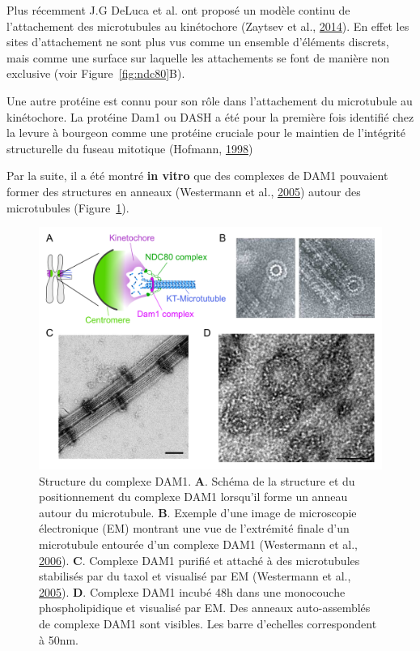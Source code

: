 \documentclass[12pt,a4paper,twoside,openright]{book}
\begin{document}
Plus récemment J.G DeLuca et al. ont proposé un modèle continu de
l'attachement des microtubules au kinétochore (Zaytsev et al.,
\protect\hyperlink{ref-Zaytsev2014}{2014}). En effet les sites
d'attachement ne sont plus vus comme un ensemble d'éléments discrets,
mais comme une surface sur laquelle les attachements se font de manière
non exclusive (voir Figure~\ref{fig:ndc80}B).

Une autre protéine est connu pour son rôle dans l'attachement du
microtubule au kinétochore. La protéine Dam1 ou DASH a été pour la
première fois identifié chez la levure à bourgeon comme une protéine
cruciale pour le maintien de l'intégrité structurelle du fuseau
mitotique (Hofmann, \protect\hyperlink{ref-Hofmann1998}{1998})

Par la suite, il a été montré \textbf{in vitro} que des complexes de
DAM1 pouvaient former des structures en anneaux (Westermann et al.,
\protect\hyperlink{ref-Westermann2005}{2005}) autour des microtubules
(Figure~\ref{fig:dam1-struct}).

\begin{figure}[htbp]
\centering
\includegraphics{figures/intro/dam1-struct.png}
\caption[Structure du complexe DAM1]{\label{fig:dam1-struct}Structure du
complexe DAM1. \textbf{A}. Schéma de la structure et du positionnement
du complexe DAM1 lorsqu'il forme un anneau autour du microtubule.
\textbf{B}. Exemple d'une image de microscopie électronique (EM)
montrant une vue de l'extrémité finale d'un microtubule entourée d'un
complexe DAM1 (Westermann et al.,
\protect\hyperlink{ref-Westermann2006}{2006}). \textbf{C}. Complexe DAM1
purifié et attaché à des microtubules stabilisés par du taxol et
visualisé par EM (Westermann et al.,
\protect\hyperlink{ref-Westermann2005}{2005}). \textbf{D}. Complexe DAM1
incubé 48h dans une monocouche phospholipidique et visualisé par EM. Des
anneaux auto-assemblés de complexe DAM1 sont visibles. Les barre
d'echelles correspondent à 50nm.}
\end{figure}
\end{document}
